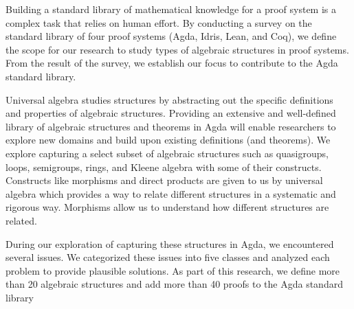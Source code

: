Building a standard library of mathematical knowledge for a proof system is a
complex task that relies on human effort. By conducting a survey on the standard library
of four proof systems (Agda, Idris, Lean, and Coq), we define the scope for our
research to study types of algebraic structures in proof systems. From the
result of the survey, we establish our focus to contribute to the Agda standard
library. 

Universal algebra studies structures by abstracting out the specific definitions
and properties of algebraic structures. Providing an extensive and
well-defined library of algebraic structures and theorems in Agda will
enable researchers to explore new domains and build upon existing definitions
(and theorems). We explore capturing a select subset of algebraic structures
such as quasigroups, loops, semigroups, rings, and Kleene algebra with some of
their constructs. Constructs like morphisms and direct products are given to us
by universal algebra which provides a way to relate different structures in a
systematic and rigorous way. Morphisms allow us to understand how different
structures are related.

During our exploration of capturing these structures in Agda, we encountered
several issues. We categorized these issues into five classes and analyzed each
problem to provide plausible solutions. As part
of this research, we define more than 20 algebraic structures and add more than
40 proofs to the Agda standard library
